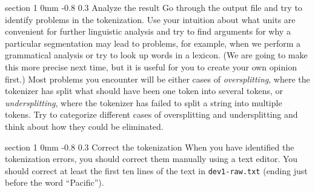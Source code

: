 \documentclass[11pt]{article}
\makeatletter
\newcommand{\newsec}[2]{\section{#1}\label{sec:#2}\noindent}
\renewcommand{\section}{\@startsection
{section}%
{1}%
{0mm}%
{-0.8\baselineskip}%
{0.3\baselineskip}%
{\bfseries\large}}%
\renewcommand{\paragraph}{%
  \@startsection{paragraph}{4}%
  {\z@}{1.5ex \@plus 1ex \@minus .2ex}{-1em}%
  {\normalfont\normalsize\bfseries}%
}\makeatother
\makeatother
\begin{document}

\newsec{Analyze the result}{analyse}%
Go through the output file and try to identify problems in the
tokenization. Use your intuition about what units are convenient for
further linguistic analysis and try to find arguments for why a
particular segmentation may lead to problems, for example, when we
perform a grammatical analysis or try to look up words in a
lexicon. (We are going to make this more precise next time, but it is
useful for you to create your own opinion first.)  Most problems you
encounter will be either cases of \emph{oversplitting}, where the
tokenizer has split what should have been one token into several
tokens, or \emph{undersplitting}, where the tokenizer has failed to
split a string into multiple tokens. Try to categorize different cases
of oversplitting and undersplitting and think about how they could be
eliminated.

\newsec{Correct the tokenization}{correct}%
When you have identified the tokenization errors, you should correct
them manually using a text editor. You should correct at least the
first ten lines of the text in {\tt dev1-raw.txt} (ending just before
the word ``Pacific'').
\end{document}
